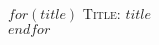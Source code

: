 \documentclass[Letter, 12pt]{report}
\begin{document}
$for(title)$
\textsc{Title}: $title$ \\
$endfor$
\end{document}
